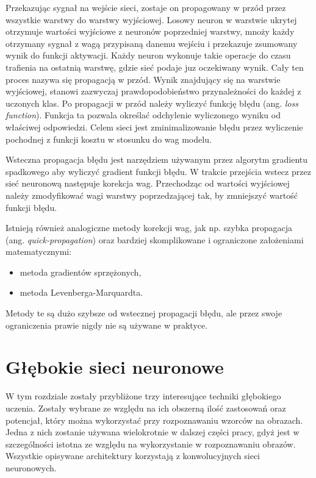 \documentclass[12pt,a4paper,twoside,titlepage,openright]{book}
\begin{document}
Przekazując sygnał na wejście sieci, zostaje on propagowany w przód przez wszystkie warstwy do warstwy wyjściowej. Losowy neuron w warstwie ukrytej otrzymuje wartości wyjściowe z neuronów poprzedniej warstwy, mnoży każdy otrzymany sygnał z wagą przypisaną danemu wejściu i przekazuje zsumowany wynik do funkcji aktywacji. Każdy neuron wykonuje takie operacje do czasu trafienia na ostatnią warstwę, gdzie sieć podaje juz oczekiwany wynik. Cały ten proces nazywa się propagacją w przód. Wynik znajdujący się na warstwie wyjściowej, stanowi zazwyczaj prawdopodobieństwo przynależności do każdej z uczonych klas. Po propagacji w przód należy wyliczyć funkcję błędu (ang. \textit{loss function}). Funkcja ta pozwala określać odchylenie wyliczonego wyniku od właściwej odpowiedzi. Celem sieci jest zminimalizowanie błędu przez wyliczenie pochodnej z funkcji kosztu w stosunku do wag modelu.

Wsteczna propagacja błędu jest narzędziem używanym przez algorytm gradientu spadkowego aby wyliczyć gradient funkcji błędu. W trakcie przejścia wstecz przez sieć neuronową następuje korekcja wag. Przechodząc od wartości wyjściowej należy zmodyfikować wagi warstwy poprzedzającej tak, by zmniejszyć wartość funkcji błędu.

Istnieją również analogiczne metody korekcji wag, jak np. szybka propagacja (ang. \textit{quick-propagation}) oraz bardziej skomplikowane i ograniczone założeniami matematycznymi: 
\begin{itemize}
\item metoda gradientów sprzężonych, 
\item metoda Levenberga-Marquardta. 
\end{itemize}

Metody te są dużo szybsze od wstecznej propagacji błędu, ale przez swoje ograniczenia prawie nigdy nie są używane w praktyce.\cite{odkrywanieSieci}


\chapter{Głębokie sieci neuronowe}
W tym rozdziale zostały przybliżone trzy interesujące techniki głębokiego uczenia. Zostały wybrane ze względu na ich obszerną ilość zastosowań oraz potencjał, który można wykorzystać przy rozpoznawaniu wzorców na obrazach. Jedna z nich zostanie używana wielokrotnie w dalszej części pracy, gdyż jest w szczególności istotna ze względu na wykorzystanie w rozpoznawaniu obrazów. Wszystkie opisywane architektury korzystają z konwolucyjnych sieci neuronowych.
\end{document}
